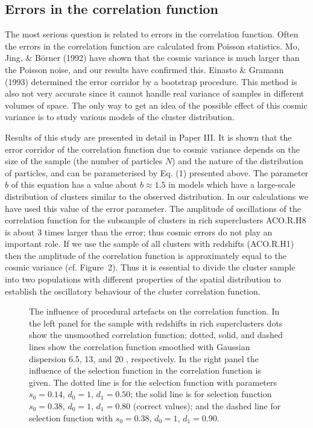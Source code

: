 \subsection{ Errors in the correlation function}

The most serious question is related to errors in the correlation
function.  Often the errors in the correlation function are calculated
from Poisson statistics. Mo, Jing, \& B\"orner (1992) have shown that
the cosmic variance is much larger than the Poisson noise, and our
results have confirmed this.  Einasto \& Gramann (1993) determined the
error corridor by a bootstrap procedure. This method is also not very
accurate since it cannot handle real variance of samples in different
volumes of space. The only way to get an idea of the possible effect
of this cosmic variance is to study various models of the cluster
distribution.

Results of this study are presented in detail in Paper III. It is shown
that the error corridor of the correlation function due to cosmic 
variance depends on the size of the sample (the number of particles
$N$) and the nature of the distribution of particles, and can be
parameterised by Eq. (1) presented above. The parameter $b$ of
this equation has a value  about $b\approx1.5$ in  models which have a
large-scale distribution of clusters similar to the observed
distribution. In our calculations we have used this value of the error
parameter. The amplitude of oscillations of the correlation function
for the subsample of clusters in rich superclusters ACO.R.H8 is
about 3 times larger than the error; thus cosmic errors do not play an 
important role. If we use the sample of all clusters with redshifts 
 (ACO.R.H1) then the amplitude of the correlation function is
approximately equal to the cosmic variance (cf.  Figure~2). Thus it is
essential to divide the cluster sample into two populations with
different properties of the spatial distribution to establish the
oscillatory behaviour of the cluster correlation function.

\begin{figure}
\vskip -17mm
\epsfysize=7cm
\caption{
The influence of procedural artefacts on the correlation function. 
In the left panel for the sample with redshifts in rich superclusters dots
show the unsmoothed correlation function; dotted, solid, and dashed
lines show the correlation function smoothed with Gaussian dispersion
6.5, 13, and 20 \Mpc, respectively. In the right panel the influence of
the selection function in the correlation function is given. The dotted
line is for the selection function with parameters $s_0=0.14$,
$d_0=1$, $d_1=0.50$; the solid line is for selection function
$s_0=0.38$, $d_0=1$, $d_1=0.80$ (correct values); and the dashed line
for selection function with $s_0=0.38$, $d_0=1$, $d_1=0.90$.}
\label{fig5}
\end{figure}



